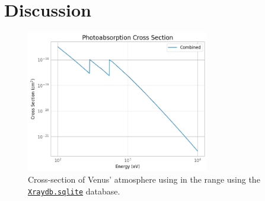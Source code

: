 \section{Discussion}

    \begin{figure}[H]
        \centering
        \includegraphics[width = 8cm]{report/Figures/discussion/crosssection.png}
        \caption{Cross-section of Venus' atmosphere using in the range using the \href{https://xraypy.github.io/XrayDB/}{\texttt{Xraydb.sqlite}} database.}
        \label{cross_sec}
    \end{figure}
    